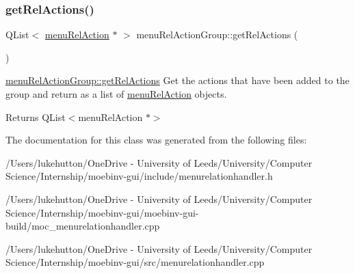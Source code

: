 \subsubsection{\texorpdfstring{get\+Rel\+Actions()}{getRelActions()}}
{\footnotesize\ttfamily Q\+List$<$ \mbox{\hyperlink{classmenu_rel_action}{menu\+Rel\+Action}} $\ast$ $>$ menu\+Rel\+Action\+Group\+::get\+Rel\+Actions (\begin{DoxyParamCaption}{ }\end{DoxyParamCaption})}



\mbox{\hyperlink{classmenu_rel_action_group_ac050bdcde34d72fc17c4fed70d2bfa6c}{menu\+Rel\+Action\+Group\+::get\+Rel\+Actions}} Get the actions that have been added to the group and return as a list of \mbox{\hyperlink{classmenu_rel_action}{menu\+Rel\+Action}} objects. 

\begin{DoxyReturn}{Returns}
Q\+List$<$menu\+Rel\+Action $\ast$$>$ 
\end{DoxyReturn}


The documentation for this class was generated from the following files\+:\begin{DoxyCompactItemize}
\item 
/\+Users/lukehutton/\+One\+Drive -\/ University of Leeds/\+University/\+Computer Science/\+Internship/moebinv-\/gui/include/menurelationhandler.\+h\item 
/\+Users/lukehutton/\+One\+Drive -\/ University of Leeds/\+University/\+Computer Science/\+Internship/moebinv-\/gui/moebinv-\/gui-\/build/moc\+\_\+menurelationhandler.\+cpp\item 
/\+Users/lukehutton/\+One\+Drive -\/ University of Leeds/\+University/\+Computer Science/\+Internship/moebinv-\/gui/src/menurelationhandler.\+cpp\end{DoxyCompactItemize}
